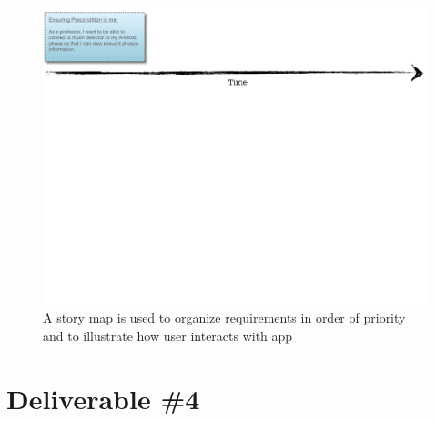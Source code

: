 \documentclass[11pt,a4paper]{article}
\begin{document}
\newpage
\begin{landscape}
\begin{figure}[h]
  \centering
  
      \includegraphics[width=1.6\textwidth]{storymap.png}
      \caption{A story map is used to organize requirements in order of priority and to illustrate how user interacts with app}
  
\end{figure}
\end{landscape}

\section*{Deliverable \#4}
\end{document}
